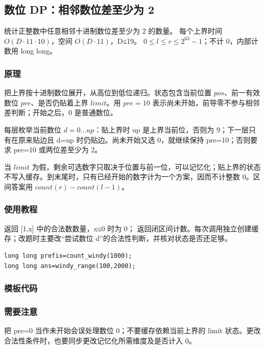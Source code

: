 \subsection{数位 DP：相邻数位差至少为 2}
\label{dp:digit-dp}
\AlgorithmInfo
    {统计正整数中任意相邻十进制数位差至少为 2 的数量。}
    {每个上界时间 $O(D\cdot11\cdot10)$，空间 $O(D\cdot11)$，D≤19。}
    {$0\le l\le r\le2^{63}-1$；不计 0，内部计数用 long long。}
\subsubsection*{原理}

把上界按十进制数位展开，从高位到低位递归。状态包含当前位置 $pos$、前一有效数位 $pre$、是否仍贴着上界 $limit$。用 $pre=10$ 表示尚未开始，前导零不参与相邻差判断；开始之后，0 是普通数位。

每层枚举当前数位 $d=0\ldots up$：贴上界时 up 是上界当前位，否则为 9；下一层只有在原来贴边且 d=up 时仍贴边。尚未开始又选 0，就继续保持 pre=10；否则要求 pre=10 或两位差至少为 2。

当 $limit$ 为假，剩余可选数字只取决于位置与前一位，可以记忆化；贴上界的状态不写入缓存。到末尾时，只有已经开始的数字计为一个方案，因而不计整数 0。区间答案用 $count(r)-count(l-1)$。

\subsubsection*{使用教程}
 返回 [1,x] 中的合法数数量，x≤0 时为 0； 返回闭区间计数。每次调用独立创建缓存；改题时主要改“尝试数位 d”的合法性判断，并核对状态是否还足够。
\begin{lstlisting}[style=mtycpp,numbers=none]
long long prefix=count_windy(1000);
long long ans=windy_range(100,2000);
\end{lstlisting}
\subsubsection*{模板代码}
\subsubsection*{需要注意}
把 pre=0 当作未开始会误处理数位 0；不要缓存依赖当前上界的 limit 状态。更改合法性条件时，也要同步更改记忆化所需维度及是否计入 0。
